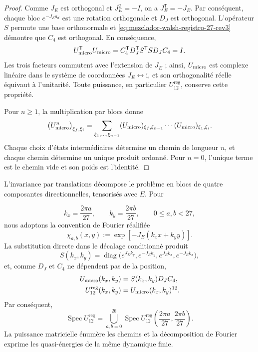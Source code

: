 \begin{proof}
Comme \(J_E\) est orthogonal et \(J_E^2=-I\), on a
\(J_E^{\mathsf T}=-J_E\). Par conséquent, chaque bloc
\(e^{-J_Ea_d}\) est une rotation orthogonale et \(D_J\) est orthogonal.
L’opérateur \(S\) permute une base orthonormale et
\eqref{eq:mezclador-walsh-registro-27-rev3} démontre que \(C_4\) est
orthogonal. En conséquence,
\[
 U_{\rm micro}^{\mathsf T}U_{\rm micro}
 =C_4^{\mathsf T}D_J^{\mathsf T}S^{\mathsf T}
   S D_JC_4
 =I.
\]
Les trois facteurs commutent avec l’extension de \(J_E\) ; ainsi,
\(U_{\rm micro}\) est complexe linéaire dans le système de coordonnées
\(J_E\leftrightarrow\mathrm i\), et son orthogonalité réelle équivaut à
l’unitarité. Toute puissance, en particulier
\(U_{12}^{\mathrm{reg}}\), conserve cette propriété.

Pour \(n\geq1\), la multiplication par blocs donne
\[
 \bigl(U_{\rm micro}^{n}\bigr)_{\xi_f,\xi_i}
 =
 \sum_{\xi_1,\ldots,\xi_{n-1}}
 (U_{\rm micro})_{\xi_f,\xi_{n-1}}
 \cdots
 (U_{\rm micro})_{\xi_1,\xi_i}.
\]
Chaque choix d'états intermédiaires détermine un chemin de longueur \(n\), et chaque chemin détermine un unique produit ordonné. Pour \(n=0\), l'unique terme est le chemin vide et son poids est l'identité.
\end{proof}

L’invariance par translations décompose le problème en blocs de quatre
composantes directionnelles, tensorisés avec \(E\). Pour

\[
 k_x=\frac{2\pi a}{27},
 \qquad
 k_y=\frac{2\pi b}{27},
 \qquad 0\leq a,b<27,
\]
nous adoptons la convention de Fourier réalifiée
\[
 \chi_{a,b}(x,y)
 :=\exp[-J_E(k_xx+k_yy)].
\]
La substitution directe dans le décalage conditionné produit
\[
 S(k_x,k_y)
 =\operatorname{diag}
 \bigl(
  e^{J_Ek_y},e^{-J_Ek_y},
  e^{J_Ek_x},e^{-J_Ek_x}
 \bigr),
\]
et, comme \(D_J\) et \(C_4\) ne dépendent pas de la position,
\begin{equation}
 \begin{aligned}
 U_{\rm micro}(k_x,k_y)
   &=S(k_x,k_y)D_JC_4,\\
 U_{12}^{\mathrm{reg}}(k_x,k_y)
   &=U_{\rm micro}(k_x,k_y)^{12}.
 \end{aligned}
 \label{eq:bloques-fourier-registro-27-rev3}
\end{equation}
Par conséquent,
\[
 \operatorname{Spec}U_{12}^{\mathrm{reg}}
 =
 \bigcup_{a,b=0}^{26}
 \operatorname{Spec}
 U_{12}^{\mathrm{reg}}
 \left(\frac{2\pi a}{27},\frac{2\pi b}{27}\right).
\]
La puissance matricielle énumère les chemins et la décomposition de Fourier exprime
les quasi-énergies de la même dynamique finie.

